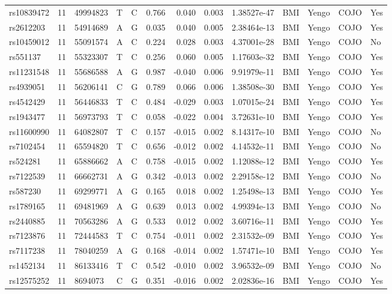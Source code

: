 \documentclass[11pt,twoside]{bristolthesis}
\begin{document}
\begin{longtable}[t]{lrlllrrrlllll}
rs10839472 & 11 & 49994823 & T & C & 0.766 & 0.040 & 0.003 & 1.38527e-47 & BMI & Yengo & COJO & Yes\\
rs2612203 & 11 & 54914689 & A & G & 0.035 & 0.040 & 0.005 & 2.38464e-13 & BMI & Yengo & COJO & Yes\\
\addlinespace
rs10459012 & 11 & 55091574 & A & C & 0.224 & 0.028 & 0.003 & 4.37001e-28 & BMI & Yengo & COJO & No\\
rs551137 & 11 & 55323307 & T & C & 0.256 & 0.060 & 0.005 & 1.17603e-32 & BMI & Yengo & COJO & Yes\\
rs11231548 & 11 & 55686588 & A & G & 0.987 & -0.040 & 0.006 & 9.91979e-11 & BMI & Yengo & COJO & Yes\\
rs4939051 & 11 & 56206141 & C & G & 0.789 & 0.066 & 0.006 & 1.38508e-30 & BMI & Yengo & COJO & Yes\\
rs4542429 & 11 & 56446833 & T & C & 0.484 & -0.029 & 0.003 & 1.07015e-24 & BMI & Yengo & COJO & Yes\\
\addlinespace
rs1943477 & 11 & 56973793 & T & C & 0.058 & -0.022 & 0.004 & 3.72631e-10 & BMI & Yengo & COJO & Yes\\
rs11600990 & 11 & 64082807 & T & C & 0.157 & -0.015 & 0.002 & 8.14317e-10 & BMI & Yengo & COJO & No\\
rs7102454 & 11 & 65594820 & T & C & 0.656 & -0.012 & 0.002 & 4.14532e-11 & BMI & Yengo & COJO & No\\
rs524281 & 11 & 65886662 & A & C & 0.758 & -0.015 & 0.002 & 1.12088e-12 & BMI & Yengo & COJO & Yes\\
rs7122539 & 11 & 66662731 & A & G & 0.342 & -0.013 & 0.002 & 2.29158e-12 & BMI & Yengo & COJO & No\\
\addlinespace
rs587230 & 11 & 69299771 & A & G & 0.165 & 0.018 & 0.002 & 1.25498e-13 & BMI & Yengo & COJO & Yes\\
rs1789165 & 11 & 69481969 & A & G & 0.639 & 0.013 & 0.002 & 4.99394e-13 & BMI & Yengo & COJO & No\\
rs2440885 & 11 & 70563286 & A & G & 0.533 & 0.012 & 0.002 & 3.60716e-11 & BMI & Yengo & COJO & Yes\\
rs7123876 & 11 & 72444583 & T & C & 0.754 & -0.011 & 0.002 & 2.31532e-09 & BMI & Yengo & COJO & Yes\\
rs7117238 & 11 & 78040259 & A & G & 0.168 & -0.014 & 0.002 & 1.57471e-10 & BMI & Yengo & COJO & Yes\\
\addlinespace
rs1452134 & 11 & 86133416 & T & C & 0.542 & -0.010 & 0.002 & 3.96532e-09 & BMI & Yengo & COJO & No\\
rs12575252 & 11 & 8694073 & C & G & 0.351 & -0.016 & 0.002 & 2.02836e-16 & BMI & Yengo & COJO & Yes\\

\end{longtable}
\end{document}
